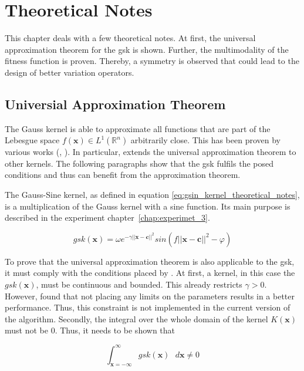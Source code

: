 \documentclass[./\jobname.tex]{subfiles}
\begin{document}
\chapter{Theoretical Notes}
This chapter deals with a few theoretical notes. At first, the universal approximation theorem for the \gls{gsk} is shown. Further, the multimodality of the fitness function is proven. Thereby, a symmetry is observed that could lead to the design of better variation operators.  

\section{Universial Approximation Theorem}
\label{chap:gsin_approximation_theorem}

The Gauss kernel is able to approximate all functions that are part of the Lebesgue space $f(\mathbf{x}) \in L^1(\mathbb{R}^n)$ arbitrarily close. This has been proven by various works (\cite{park_universal_1991}, \cite{hangelbroek_nonlinear_2010}). In particular, \cite{park_universal_1991} extends the universal approximation theorem to other kernels. The following paragraphs show that the \gls{gsk} fulfils the posed conditions and thus can benefit from the approximation theorem. 

The Gauss-Sine kernel, as defined in equation \eqref{eq:gsin_kernel_theoretical_notes}, is a multiplication of the Gauss kernel with a sine function. Its main purpose is described in the experiment \mbox{chapter \ref{chap:experimet_3}}. 

\begin{equation}
\label{eq:gsin_kernel_theoretical_notes}
gsk(\mathbf{x}) = \omega e^{-\gamma ||\mathbf{x} - \mathbf{c}||^2} sin(f ||\mathbf{x} - \mathbf{c}||^2 - \varphi)
\end{equation}

To prove that the universal approximation theorem is also applicable to the \gls{gsk}, it must comply with the conditions placed by \cite{park_universal_1991}. At first, a kernel, in this case the $gsk(\mathbf{x})$, must be continuous and bounded. This already restricts $\gamma > 0$. However, \cite{chaquet_using_2019} found that not placing any limits on the parameters results in a better performance. Thus, this constraint is not implemented in the current version of the algorithm. Secondly, the integral over the whole domain of the kernel $K(\mathbf{x})$ must not be $0$. Thus, it needs to be shown that 

\begin{equation}
\int_{\mathbf{x} = -\mathbf{\infty}}^{\infty} gsk(\mathbf{x}) \text{ } d\mathbf{x} \neq 0
\end{equation} 
\end{document}

